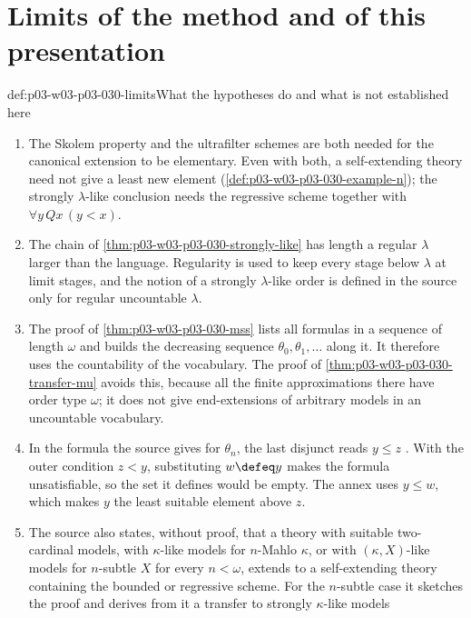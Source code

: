 \section{Limits of the method and of this presentation}
\label{sec:p03-w03-p03-030-limits}

\begin{hbwarning}{def:p03-w03-p03-030-limits}{What the hypotheses do and what is not established here}
\begin{enumerate}
\item The Skolem property and the ultrafilter schemes are both needed for the
  canonical extension to be elementary.  Even with both, a self-extending
  theory need not give a least new element
  (\cref{def:p03-w03-p03-030-example-n}); the strongly \(\lambda\)-like
  conclusion needs the regressive scheme together with
  \(\forall y\,Qx\,(y<x)\).
\item The chain of \cref{thm:p03-w03-p03-030-strongly-like} has length a
  regular \(\lambda\) larger than the language.  Regularity is used to keep
  every stage below \(\lambda\) at limit stages, and the notion of a
  strongly \(\lambda\)-like order is defined in the source only for regular
  uncountable \(\lambda\).
\item The proof of \cref{thm:p03-w03-p03-030-mss} lists all formulas in a
  sequence of length \(\omega\) and builds the decreasing sequence
  \(\theta_0,\theta_1,\ldots\) along it.  It therefore uses the countability
  of the vocabulary.  The proof of \cref{thm:p03-w03-p03-030-transfer-mu}
  avoids this, because all the finite approximations there have order type
  \(\omega\); it does not give end-extensions of arbitrary models in an
  uncountable vocabulary.
\item In the formula the source gives for \(\theta_n\), the last disjunct
  reads \(y\le z\) \cite[p.~207]{Schmerl1985TransferTheorems}.  With the
  outer condition \(z<y\), substituting \(w\defeq y\) makes the formula
  unsatisfiable, so the set it defines would be empty.  The annex uses
  \(y\le w\), which makes \(y\) the least suitable element above \(z\).
\item The source also states, without proof, that a theory with suitable
  two-cardinal models, with \(\kappa\)-like models for \(n\)-Mahlo
  \(\kappa\), or with \((\kappa,X)\)-like models for \(n\)-subtle \(X\) for
  every \(n<\omega\), extends to a self-extending theory containing the
  bounded or regressive scheme.  For the \(n\)-subtle case it sketches the
  proof and derives from it a transfer to strongly \(\kappa\)-like models

\end{enumerate}
\end{hbwarning}
